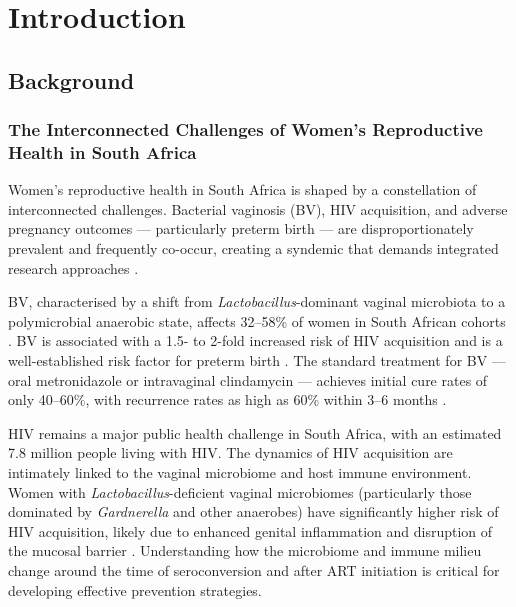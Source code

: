 \documentclass[12pt,a4paper]{report}
\begin{document}
\chapter{Introduction}

\section{Background}

\subsection{The Interconnected Challenges of Women's Reproductive Health in South Africa}

Women's reproductive health in South Africa is shaped by a constellation of interconnected challenges. Bacterial vaginosis (BV), HIV acquisition, and adverse pregnancy outcomes --- particularly preterm birth --- are disproportionately prevalent and frequently co-occur, creating a syndemic that demands integrated research approaches \cite{barnabas2018converging, gilbert2025, peebles2019high}.

BV, characterised by a shift from \textit{Lactobacillus}-dominant vaginal microbiota to a polymicrobial anaerobic state, affects 32--58\% of women in South African cohorts \cite{nicd2025, mbulawa2025}. BV is associated with a 1.5- to 2-fold increased risk of HIV acquisition \cite{gosmann2017lactobacillus, atashili2008} and is a well-established risk factor for preterm birth \cite{srinivasan2012, hillier1995, goldenberg2000}. The standard treatment for BV --- oral metronidazole or intravaginal clindamycin --- achieves initial cure rates of only 40--60\%, with recurrence rates as high as 60\% within 3--6 months \cite{bradshaw2016current}.

HIV remains a major public health challenge in South Africa, with an estimated 7.8 million people living with HIV. The dynamics of HIV acquisition are intimately linked to the vaginal microbiome and host immune environment. Women with \textit{Lactobacillus}-deficient vaginal microbiomes (particularly those dominated by \textit{Gardnerella} and other anaerobes) have significantly higher risk of HIV acquisition, likely due to enhanced genital inflammation and disruption of the mucosal barrier \cite{gosmann2017lactobacillus, lennard2018microbial}. Understanding how the microbiome and immune milieu change around the time of seroconversion and after ART initiation is critical for developing effective prevention strategies.
\end{document}
